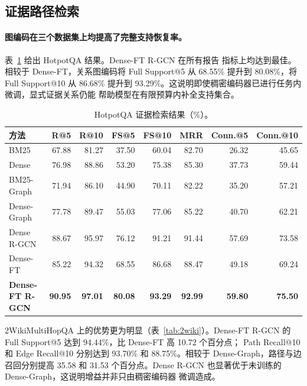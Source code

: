 \subsection{证据路径检索}

\paragraph{图编码在三个数据集上均提高了完整支持恢复率。}
表~\ref{tab:hotpot} 给出 HotpotQA 结果。Dense-FT R-GCN 在所有报告
指标上均达到最佳。相较于 Dense-FT，关系图编码将 Full Support@5
从 68.55\% 提升到 80.08\%，将 Full Support@10 从 86.68\% 提升到
93.29\%。这说明即使稠密编码器已进行任务内微调，显式证据关系仍能
帮助模型在有限预算内补全支持集合。

\begin{table}[t]
\centering
\small
\setlength{\tabcolsep}{4pt}
\caption{HotpotQA 证据检索结果（\%）。}
\label{tab:hotpot}
\begin{tabular}{lrrrrrrr}
\hline
方法 & R@5 & R@10 & FS@5 & FS@10 & MRR & Conn.@5 & Conn.@10 \\
\hline
BM25 & 67.88 & 81.27 & 37.50 & 60.04 & 82.70 & 26.32 & 45.65 \\
Dense & 76.98 & 88.86 & 53.20 & 75.38 & 85.30 & 37.73 & 59.44 \\
BM25-Graph & 71.94 & 86.10 & 44.90 & 70.11 & 82.22 & 35.20 & 57.21 \\
Dense-Graph & 77.78 & 89.47 & 55.03 & 77.06 & 85.22 & 40.70 & 62.21 \\
Dense R-GCN & 88.67 & 95.97 & 76.12 & 91.21 & 91.44 & 57.69 & 73.58 \\
Dense-FT & 85.22 & 94.32 & 68.55 & 86.68 & 88.47 & 49.18 & 69.24 \\
\textbf{Dense-FT R-GCN} & \textbf{90.95} & \textbf{97.01} &
\textbf{80.08} & \textbf{93.29} & \textbf{92.99} &
\textbf{59.80} & \textbf{75.50} \\
\hline
\end{tabular}
\end{table}

2WikiMultiHopQA 上的优势更为明显（表~\ref{tab:2wiki}）。Dense-FT
R-GCN 的 Full Support@5 达到 94.44\%，比 Dense-FT 高 10.72 个百分点；
Path Recall@10 和 Edge Recall@10 分别达到 93.70\% 和 88.75\%。相较于
Dense-Graph，路径与边召回分别提高 35.58 和 31.53 个百分点。Dense
R-GCN 也显著优于未训练的 Dense-Graph，这说明增益并非只由稠密编码器
微调造成。

